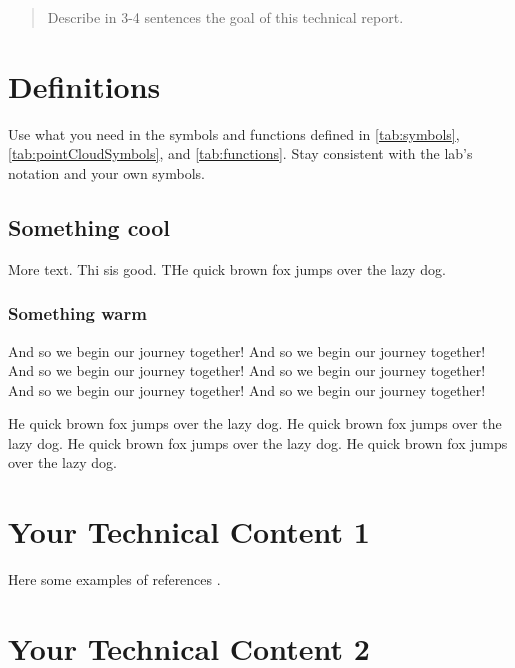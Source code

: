 \documentclass[12pt,letterpaper,oneside]{article}
\begin{document}
\makeCustomTitle

\begin{abstract}
Describe in 3-4 sentences the goal of this technical report.
\lightlipsum[1]
\end{abstract}

\section{Definitions}

Use what you need in the symbols and functions defined in \autoref{tab:symbols}, \autoref{tab:pointCloudSymbols}, and \autoref{tab:functions}.
Stay consistent with the lab's notation and your own symbols.

\subsection{Something cool}

More text. Thi sis good. THe quick brown fox jumps over the lazy dog.

\subsubsection{Something warm}

And so we begin our journey together!
And so we begin our journey together!
And so we begin our journey together!
And so we begin our journey together!
And so we begin our journey together!
And so we begin our journey together!

He quick brown fox jumps over the lazy dog.
He quick brown fox jumps over the lazy dog.
He quick brown fox jumps over the lazy dog.
He quick brown fox jumps over the lazy dog.


\newpage
\section{Your Technical Content 1}%
Here some examples of references \cite{Pomerleau2013,Pomerleau2014}.
\lightlipsum[1-2]

\newpage
\section{Your Technical Content 2}%
\lightlipsum[1-2]

\printbibliography
\end{document}
